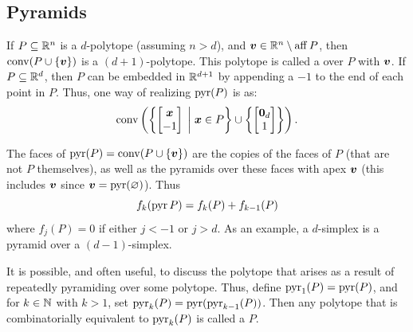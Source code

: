     \subsection{Pyramids}
        If \(P\subseteq\mathbb{R}^{n}\) is a \(d\)-polytope (assuming \(n>d\)), and \(\bm{v}\in\mathbb{R}^{n}\setminus\operatorname{aff} P\), then \(\operatorname{conv}(P\cup\left\{\bm{v}\right\})\) is a \((d+1)\)-polytope.  This polytope is called a  over \(P\) with  \(\bm{v}\).  If \(P\subseteq \mathbb{R}^{d}\), then \(P\) can be embedded in \(\mathbb{R}^{d+1}\) by appending a \(-1\) to the end of each point in \(P\).  Thus, one way of realizing \(\operatorname{pyr}(P)\) is as:
            \[
                \conv\left(\setb{\begin{bmatrix}\ve x\\ -1\end{bmatrix}}{\ve x\in P}\cup\seta{\begin{bmatrix}\ve0_d\\ 1\end{bmatrix}}\right).
            \]

        The faces of \(\operatorname{pyr}(P)=\operatorname{conv}(P\cup\left\{\bm{v}\right\})\) are the copies of the faces of \(P\) (that are not \(P\) themselves), as well as the pyramids over these faces with apex \(\bm{v}\) (this includes \(\bm{v}\) since \(\bm{v}=\operatorname{pyr}(\varnothing)\)).  Thus
            \[
                f_k(\operatorname{pyr} P)=f_k(P)+f_{k-1}(P)
            \]
        where \(f_j(P)=0\) if either \(j<-1\) or \(j>d\).  As an example, a \(d\)-simplex is a pyramid over a \((d-1)\)-simplex.

        It is possible, and often useful, to discuss the polytope that arises as a result of repeatedly pyramiding over some polytope.  Thus, define \(\operatorname{pyr}_1(P)=\operatorname{pyr}(P)\), and for \(k\in\mathbb{N}\) with \(k>1\), set \(\operatorname{pyr}_k(P)=\operatorname{pyr}(\operatorname{pyr}_{k-1}(P))\).  Then any polytope that is combinatorially equivalent to \(\operatorname{pyr}_k(P)\) is called a  \(P\).
